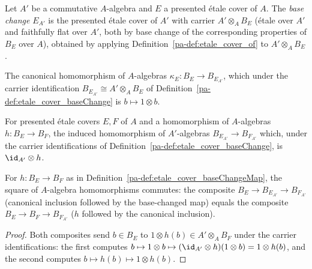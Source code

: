 \begin{definition}
  \label{pa-def:etale_cover_baseChange}
  \leanok

  Let \(A'\) be a commutative \(A\)-algebra and \(E\) a presented \'etale cover of \(A\). The
  \emph{base change} \(E_{A'}\) is the presented \'etale cover of \(A'\) with carrier
  \(A' \otimes_A B_E\) (\'etale over \(A'\) and faithfully flat over \(A'\), both by base
  change of the corresponding properties of \(B_E\) over \(A\)), obtained by applying
  Definition~\ref{pa-def:etale_cover_of} to \(A' \otimes_A B_E\).
\end{definition}

\begin{definition}
  \label{pa-def:etale_cover_baseChangeInclude}
  \leanok

  The canonical homomorphism of \(A\)-algebras \(\kappa_E \colon B_E \to B_{E_{A'}}\), which
  under the carrier identification \(B_{E_{A'}} \cong A' \otimes_A B_E\) of
  Definition~\ref{pa-def:etale_cover_baseChange} is \(b \mapsto 1 \otimes b\).
\end{definition}

\begin{definition}
  \label{pa-def:etale_cover_baseChangeMap}
  \leanok

  For presented \'etale covers \(E, F\) of \(A\) and a homomorphism of \(A\)-algebras
  \(h \colon B_E \to B_F\), the induced homomorphism of \(A'\)-algebras \(B_{E_{A'}} \to
  B_{F_{A'}}\) which, under the carrier identifications of
  Definition~\ref{pa-def:etale_cover_baseChange}, is \(\id_{A'} \otimes h\).
\end{definition}

\begin{lemma}
  \label{pa-lem:etale_cover_baseChangeMap_comp_baseChangeInclude}
  \leanok

  For \(h \colon B_E \to B_F\) as in Definition~\ref{pa-def:etale_cover_baseChangeMap}, the square
  of \(A\)-algebra homomorphisms commutes: the composite \(B_E \to B_{E_{A'}} \to B_{F_{A'}}\)
  (canonical inclusion followed by the base-changed map) equals the composite
  \(B_E \to B_F \to B_{F_{A'}}\) (\(h\) followed by the canonical inclusion).
\end{lemma}
\begin{proof}
  \leanok
  Both composites send \(b \in B_E\) to \(1 \otimes h(b) \in A' \otimes_A B_F\) under the
  carrier identifications: the first computes \(b \mapsto 1 \otimes b \mapsto
  (\id_{A'}\otimes h)(1 \otimes b) = 1 \otimes h(b)\), and the second computes
  \(b \mapsto h(b) \mapsto 1 \otimes h(b)\).
\end{proof}

